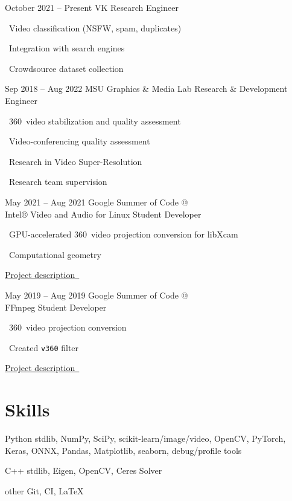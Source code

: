 \documentclass{tccv}
\newcommand{\itempoint}{\faAngleDoubleRight~}
\newcommand{\sphere}{360\textdegree~}
\begin{document}
\begin{eventlist}

\item{October 2021 -- Present}
     {VK}
     {Research Engineer}

     \itempoint Video classification (NSFW, spam, duplicates)

     \itempoint Integration with search engines

     \itempoint Crowdsource dataset collection

\item{Sep 2018 -- Aug 2022}
     {MSU Graphics \& Media Lab}
     {Research \& Development Engineer}

     \itempoint \sphere video stabilization and quality assessment

     \itempoint Video-conferencing quality assessment

     \itempoint Research in Video Super-Resolution

     \itempoint Research team supervision


\item{May 2021 -- Aug 2021}
     {Google Summer of Code @ \\ Intel® Video and Audio for Linux}
     {Student Developer}

     \itempoint GPU-accelerated \sphere video projection conversion for libXcam

     \itempoint Computational geometry

     \href{https://unishift.github.io/project/2021-08-20-gsoc-libxcam}{Project description~\faExternalLink*}

\item{May 2019 -- Aug 2019}
     {Google Summer of Code @ \\ FFmpeg}
     {Student Developer}
     
     \itempoint \sphere video projection conversion

     \itempoint Created \texttt{v360} filter

     \href{https://unishift.github.io/project/2019-08-26-gsoc-ffmpeg}{Project description~\faExternalLink*}

\end{eventlist}

\section{Skills}

\begin{factlist}

\item{Python}
     {stdlib, NumPy, SciPy, scikit-learn/image/video, OpenCV, PyTorch, Keras, ONNX, Pandas, Matplotlib, seaborn, debug/profile tools}

\item{C++}
     {stdlib, Eigen, OpenCV, Ceres Solver}

\item{other}
     {Git, CI, \LaTeX}

\end{factlist}
\end{document}
